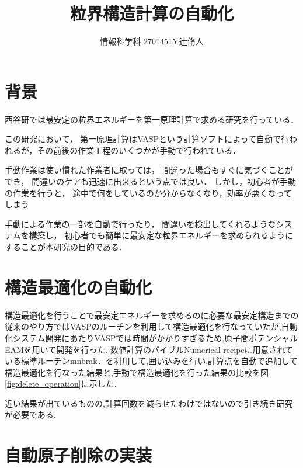 \documentclass[a4j,twocolumn]{jsarticle}
\begin{document}
\title{粒界構造計算の自動化}
\author{情報科学科 \hspace{5mm} 27014515 \hspace{5mm} 辻脩人}
\date{}
\maketitle

\section{背景}
    西谷研では最安定の粒界エネルギーを第一原理計算で求める研究を行っている．

この研究において，
第一原理計算はVASPという計算ソフトによって自動で行われるが，その前後の作業工程のいくつかが手動で行われている．

手動作業は使い慣れた作業者に取っては，
間違った場合もすぐに気づくことができ，
間違いのケアも迅速に出来るという点では良い．
しかし，初心者が手動の作業を行うと，
途中で何をしているのか分からなくなり，効率が悪くなってしまう

手動による作業の一部を自動で行ったり，
間違いを検出してくれるようなシステムを構築し，
初心者でも簡単に最安定な粒界エネルギーを求められるようにすることが本研究の目的である．

\section{構造最適化の自動化}
構造最適化を行うことで最安定エネルギーを求めるのに必要な最安定構造までの
従来のやり方ではVASPのルーチンを利用して構造最適化を行なっていたが,自動化システム開発にあたりVASPでは時間がかかりすぎるため,原子間ポテンシャルEAMを用いて開発を行った.
数値計算のバイブルNumerical recipeに用意されている標準ルーチンmnbrak\cite{num_recipe}．を利用して,囲い込みを行い,計算点を自動で追加して構造最適化を行なった結果と,手動で構造最適化を行った結果の比較を図\ref{fig:delete_operation}に示した．

近い結果が出ているものの,計算回数を減らせたわけではないので引き続き研究が必要である.


\section{自動原子削除の実装}
\end{document}
